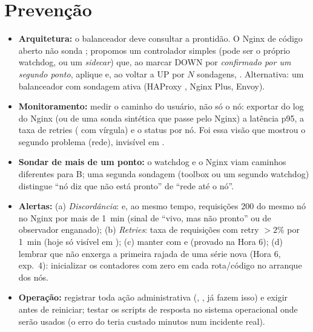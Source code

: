 \documentclass[10pt,a4paper]{article}
\begin{document}
{\section{Prevenção}
\begin{itemize}[leftmargin=*]
  \item \textbf{Arquitetura:} o balanceador deve consultar a prontidão. O Nginx de código aberto não sonda ; propomos um controlador simples (pode ser o próprio watchdog, ou um \emph{sidecar}) que, ao marcar DOWN por  \emph{confirmado por um segundo ponto}, aplique  e, ao voltar a UP por $N$ sondagens, . Alternativa: um balanceador com sondagem ativa (HAProxy , Nginx Plus, Envoy).
  \item \textbf{Monitoramento:} medir o caminho do usuário, não só o nó: exportar do log do Nginx (ou de uma sonda sintética que passe pelo Nginx) a latência p95, a taxa de retries ( com vírgula) e o status por nó. Foi essa visão que mostrou o segundo problema (rede), invisível em .
  \item \textbf{Sondar de mais de um ponto:} o watchdog e o Nginx viam caminhos diferentes para B; uma segunda sondagem (toolbox ou um segundo watchdog) distingue ``nó diz que não está pronto'' de ``rede até o nó''.
  \item \textbf{Alertas:} (a) \emph{Discordância}:  e, ao mesmo tempo, requisições 200 do mesmo nó no Nginx por mais de 1~min (sinal de ``vivo, mas não pronto'' ou de observador enganado); (b) \emph{Retries}: taxa de requisições com retry $> 2\%$ por 1~min (hoje só visível em ); (c) manter  com  e  (provado na Hora 6); (d) lembrar que  não enxerga a primeira rajada de uma série nova (Hora 6, exp.~4): inicializar os contadores com zero em cada rota/código no arranque dos nós.
  \item \textbf{Operação:} registrar toda ação administrativa (, ,  já fazem isso) e exigir  antes de reiniciar; testar os scripts de resposta no sistema operacional onde serão usados (o erro do  teria custado minutos num incidente real).
\end{itemize}

}
\end{document}
